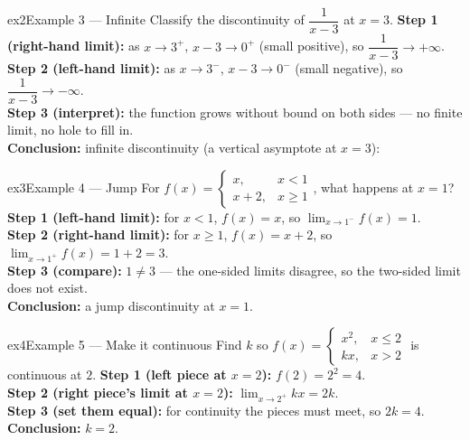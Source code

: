 \documentclass[11pt]{article}
\begin{document}
\begin{example}{ex2}{Example 3 --- Infinite}
Classify the discontinuity of $\dfrac1{x-3}$ at $x=3$.\soln
\textbf{Step 1 (right-hand limit):} as $x\to3^+$, $x-3\to0^+$ (small positive), so $\dfrac1{x-3}\to+\infty$.\\[3pt]
\textbf{Step 2 (left-hand limit):} as $x\to3^-$, $x-3\to0^-$ (small negative), so $\dfrac1{x-3}\to-\infty$.\\[3pt]
\textbf{Step 3 (interpret):} the function grows without bound on both sides --- no finite limit, no hole to fill in.\\[3pt]
\textbf{Conclusion:} infinite discontinuity (a vertical asymptote at $x=3$):
\end{example}

\begin{example}{ex3}{Example 4 --- Jump}
For $f(x)=\begin{cases}x,&x<1\\x+2,&x\ge1\end{cases}$, what happens at $x=1$?\soln
\textbf{Step 1 (left-hand limit):} for $x<1$, $f(x)=x$, so $\lim_{x\to1^-}f(x)=1$.\\[3pt]
\textbf{Step 2 (right-hand limit):} for $x\ge1$, $f(x)=x+2$, so $\lim_{x\to1^+}f(x)=1+2=3$.\\[3pt]
\textbf{Step 3 (compare):} $1\ne3$ --- the one-sided limits disagree, so the two-sided limit does not exist.\\[3pt]
\textbf{Conclusion:} a jump discontinuity at $x=1$.
\end{example}

\begin{example}{ex4}{Example 5 --- Make it continuous}
Find $k$ so $f(x)=\begin{cases}x^2,&x\le2\\kx,&x>2\end{cases}$ is continuous at $2$.\soln
\textbf{Step 1 (left piece at $x=2$):} $f(2)=2^2=4$.\\[3pt]
\textbf{Step 2 (right piece's limit at $x=2$):} $\lim_{x\to2^+}kx=2k$.\\[3pt]
\textbf{Step 3 (set them equal):} for continuity the pieces must meet, so $2k=4$.\\[3pt]
\textbf{Conclusion:} $k=2$.
\end{example}
\end{document}
